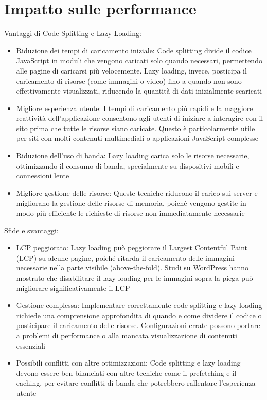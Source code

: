 \section{Impatto sulle performance}

Vantaggi di Code Splitting e Lazy Loading:
\begin{itemize}
    \item Riduzione dei tempi di caricamento iniziale: Code splitting divide il codice JavaScript in moduli che vengono caricati solo quando necessari, permettendo alle pagine di caricarsi più velocemente. Lazy loading, invece, posticipa il caricamento di risorse (come immagini o video) fino a quando non sono effettivamente visualizzati, riducendo la quantità di dati inizialmente scaricati
    \item Migliore esperienza utente: I tempi di caricamento più rapidi e la maggiore reattività dell'applicazione consentono agli utenti di iniziare a interagire con il sito prima che tutte le risorse siano caricate. Questo è particolarmente utile per siti con molti contenuti multimediali o applicazioni JavaScript complesse
    \item Riduzione dell'uso di banda: Lazy loading carica solo le risorse necessarie, ottimizzando il consumo di banda, specialmente su dispositivi mobili e connessioni lente
    \item Migliore gestione delle risorse: Queste tecniche riducono il carico sui server e migliorano la gestione delle risorse di memoria, poiché vengono gestite in modo più efficiente le richieste di risorse non immediatamente necessarie
\end{itemize}

Sfide e svantaggi:
\begin{itemize}
    \item LCP peggiorato: Lazy loading può peggiorare il Largest Contentful Paint (LCP) su alcune pagine, poiché ritarda il caricamento delle immagini necessarie nella parte visibile (above-the-fold). Studi su WordPress hanno mostrato che disabilitare il lazy loading per le immagini sopra la piega può migliorare significativamente il LCP
    \item Gestione complessa: Implementare correttamente code splitting e lazy loading richiede una comprensione approfondita di quando e come dividere il codice o posticipare il caricamento delle risorse. Configurazioni errate possono portare a problemi di performance o alla mancata visualizzazione di contenuti essenziali
    \item Possibili conflitti con altre ottimizzazioni: Code splitting e lazy loading devono essere ben bilanciati con altre tecniche come il prefetching e il caching, per evitare conflitti di banda che potrebbero rallentare l'esperienza utente
\end{itemize}